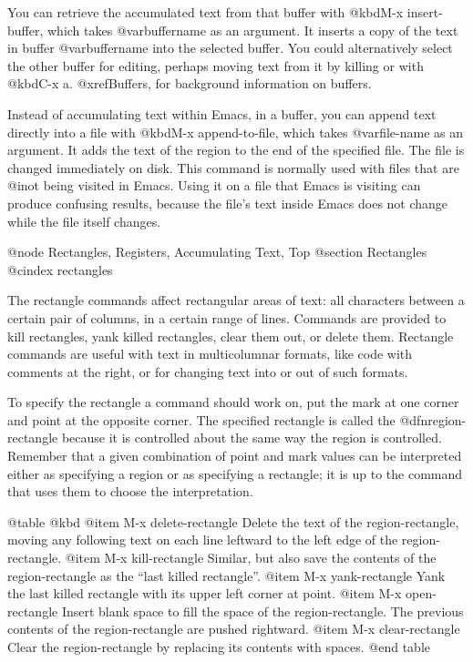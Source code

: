 {{{{  You can retrieve the accumulated text from that buffer with @kbd{M-x
insert-buffer}, which takes @var{buffername} as an argument.  It inserts
a copy of the text in buffer @var{buffername} into the selected buffer.
You could alternatively select the other buffer for editing, perhaps moving
text from it by killing or with @kbd{C-x a}.  @xref{Buffers}, for
background information on buffers.

  Instead of accumulating text within Emacs, in a buffer, you can append
text directly into a file with @kbd{M-x append-to-file}, which takes
@var{file-name} as an argument.  It adds the text of the region to the
end of the specified file.  The file is changed immediately on disk.
This command is normally used with files that are @i{not} being visited
in Emacs.  Using it on a file that Emacs is visiting can produce
confusing results, because the file's text inside Emacs does not change
while the file itself changes.

@node Rectangles, Registers, Accumulating Text, Top
@section Rectangles
@cindex rectangles

  The rectangle commands affect rectangular areas of text: all
characters between a certain pair of columns, in a certain range of lines.
Commands are provided to kill rectangles, yank killed rectangles, clear
them out, or delete them.  Rectangle commands are useful with text in
multicolumnar formats, like code with comments at the right,
or for changing text into or out of such formats.

  To specify the rectangle a command should work on, put the mark at one
corner and point at the opposite corner.  The specified rectangle is
called the @dfn{region-rectangle} because it is controlled about the
same way the region is controlled.  Remember that a given
combination of point and mark values can be interpreted either as
specifying a region or as specifying a rectangle; it is up to the
command that uses them to choose the interpretation.

@table @kbd
@item M-x delete-rectangle
Delete the text of the region-rectangle, moving any following text on
each line leftward to the left edge of the region-rectangle.
@item M-x kill-rectangle
Similar, but also save the contents of the region-rectangle as the
``last killed rectangle''.
@item M-x yank-rectangle
Yank the last killed rectangle with its upper left corner at point.
@item M-x open-rectangle
Insert blank space to fill the space of the region-rectangle.
The previous contents of the region-rectangle are pushed rightward.
@item M-x clear-rectangle
Clear the region-rectangle by replacing its contents with spaces.
@end table

}}}}
